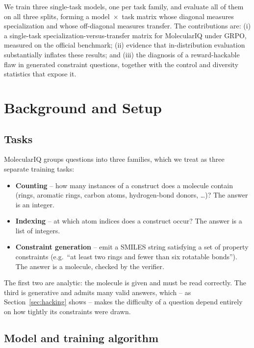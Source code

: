 \documentclass[a4paper,oneside,10pt,ngerman,english]{scrartcl}
\begin{document}
We train three single-task models, one per task family, and evaluate all of
them on all three splits, forming a model~$\times$~task matrix whose diagonal
measures specialization and whose off-diagonal measures transfer. The
contributions are: (i) a single-task specialization-versus-transfer matrix for
MolecularIQ under GRPO, measured on the official benchmark; (ii) evidence that
in-distribution evaluation substantially inflates these results; and (iii) the
diagnosis of a reward-hackable flaw in generated constraint questions, together
with the control and diversity statistics that expose it.

\section{Background and Setup}
\label{sec:background}

\subsection{Tasks}

MolecularIQ groups questions into three families, which we treat as three
separate training tasks:

\begin{itemize}
\item \textbf{Counting} -- how many instances of a construct does a molecule
      contain (rings, aromatic rings, carbon atoms, hydrogen-bond donors,
      \dots)? The answer is an integer.
\item \textbf{Indexing} -- at which atom indices does a construct occur? The
      answer is a list of integers.
\item \textbf{Constraint generation} -- emit a SMILES string satisfying a set
      of property constraints (e.g.\ ``at least two rings and fewer than six
      rotatable bonds''). The answer is a molecule, checked by the verifier.
\end{itemize}

The first two are analytic: the molecule is given and must be read correctly.
The third is generative and admits many valid answers, which -- as
Section~\ref{sec:hacking} shows -- makes the difficulty of a question depend
entirely on how tightly its constraints were drawn.

\subsection{Model and training algorithm}
\end{document}
